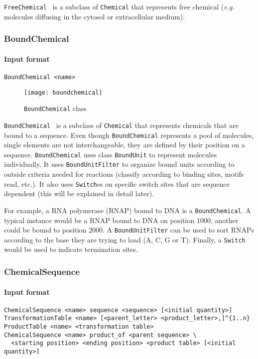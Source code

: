 \texttt{FreeChemical}~ is a subclass of \texttt{Chemical}
that represents free chemical (\textit{e.g.} molecules diffusing in the cytosol or extracellular medium).

\subsubsection{BoundChemical}

\paragraph{Input format}
\begin{verbatim}
BoundChemical <name>
\end{verbatim}

\begin{figure}[!h]
  \centering
  \texttt{[image: boundchemical]}
  \caption{\texttt{BoundChemical} class}
\label{fig:bound_chemical}
\end{figure}

\texttt{BoundChemical}~ is a subclass of \texttt{Chemical}
that represents chemicals that are bound to a sequence.
Even though \texttt{BoundChemical} represents a pool of molecules,
single elements are not interchangeable,
they are defined by their position on a sequence.
\texttt{BoundChemical} uses class \texttt{BoundUnit} to represent molecules individually.
It uses \texttt{BoundUnitFilter} to organize bound units according to outside criteria
needed for reactions (classify according to binding sites, motifs read, etc.).
It also uses \texttt{Switch}es on specific switch sites that are sequence dependent
(this will be explained in detail later).

For example, a RNA polymerase (RNAP) bound to DNA is a \texttt{BoundChemical}.
A typical instance would be a RNAP bound to DNA on position 1000,
another could be bound to position 2000.
A \texttt{BoundUnitFilter} can be used to sort RNAPs according to the base
they are trying to load (A, C, G or T).
Finally, a \texttt{Switch} would be used to indicate termination sites.

\subsubsection{ChemicalSequence}

\paragraph{Input format}
\begin{verbatim}
ChemicalSequence <name> sequence <sequence> [<initial quantity>]
TransformationTable <name> [<parent_letter> <product_letter>,]^{1..n}
ProductTable <name> <transformation table>
ChemicalSequence <name> product_of <parent sequence> \
  <starting position> <ending position> <product table> [<initial quantity>]
\end{verbatim}

